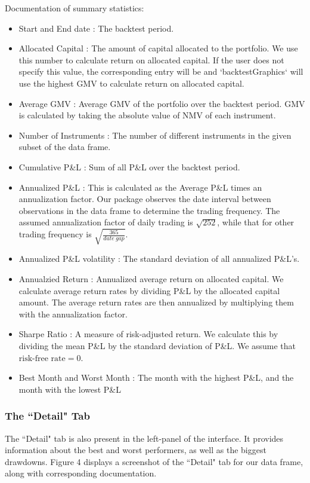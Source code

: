 \documentclass[article]{jss}
\begin{document}
Documentation of summary statistics:

\begin{itemize}
\item{Start and End date : The backtest period.}
\item{Allocated Capital : The amount of capital allocated to the portfolio. We use this number to calculate return on allocated capital. If the user does not specify this value, the corresponding entry will be  and `backtestGraphics` will use the highest GMV to calculate return on allocated capital.
}
\item{Average GMV : Average GMV of the portfolio over the backtest period. GMV is calculated by taking the absolute value of NMV of each instrument. }
\item{Number of Instruments : The number of different instruments in the given subset of the data frame.}
\item{Cumulative P\&L : Sum of all P\&L over the backtest period.}
\item{Annualized P\&L : This is calculated as the Average P\&L times an annualization factor. Our package observes the date interval between observations in the data frame to determine the trading frequency. The assumed annualization factor of
daily trading is $\sqrt{252}$, while that for other trading frequency is $\sqrt{\frac{365}{date \ gap}}$.}
\item{Annualized P\&L volatility : The standard deviation of all
annualized P\&L's.}
\item{Annualzied Return : Annualized average return on allocated
capital. We calculate average return rates by dividing P\&L by the allocated capital amount.  The average return rates are then annualized by multiplying them with the annualization factor.
}
\item{Sharpe Ratio : A measure of risk-adjusted return. We calculate this by dividing the mean P\&L by the standard deviation of P\&L. We assume that $\text{risk-free rate} = 0$.}
\item{Best Month and Worst Month : The month with the highest P\&L, and
the month with the lowest P\&L}
\end{itemize}

\subsubsection{The ``Detail" Tab}
The ``Detail" tab is also present in the left-panel of the  interface. It provides information about the best and worst performers, as well as the biggest drawdowns. Figure 4 displays a screenshot of the ``Detail" tab for our  data frame, along with corresponding documentation.
\end{document}

